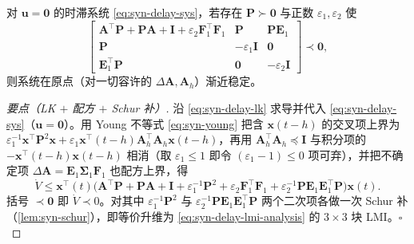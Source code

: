\begin{theorem}
\label{thm:syn-delay-stab}
对 $\mathbf u=\mathbf 0$ 的时滞系统 \cref{eq:syn-delay-sys}，若存在 $\mathbf P\succ\mathbf 0$ 与正数 $\varepsilon_1,\varepsilon_2$ 使
\begin{equation}
  \begin{bmatrix}\mathbf A^\top\mathbf P+\mathbf P\mathbf A+\mathbf I+\varepsilon_2\mathbf F_1^\top\mathbf F_1 & \mathbf P & \mathbf P\mathbf E_1\\ \mathbf P & -\varepsilon_1\mathbf I & \mathbf 0\\ \mathbf E_1^\top\mathbf P & \mathbf 0 & -\varepsilon_2\mathbf I\end{bmatrix}\prec\mathbf 0,
  \label{eq:syn-delay-lmi-analysis}
\end{equation}
则系统在原点（对一切容许的 $\Delta\mathbf A,\mathbf A_h$）渐近稳定。
\end{theorem}
\begin{proof}[要点（LK $+$ 配方 $+$ Schur 补）]
沿 \cref{eq:syn-delay-lk} 求导并代入 \cref{eq:syn-delay-sys}（$\mathbf u=\mathbf 0$）。用 Young 不等式 \cref{eq:syn-young} 把含 $\mathbf x(t-h)$ 的交叉项上界为 $\varepsilon_1^{-1}\mathbf x^\top\mathbf P^2\mathbf x+\varepsilon_1\mathbf x^\top(t-h)\mathbf A_h^\top\mathbf A_h\mathbf x(t-h)$，再用 $\mathbf A_h^\top\mathbf A_h\preceq\mathbf I$ 与积分项的 $-\mathbf x^\top(t-h)\mathbf x(t-h)$ 相消（取 $\varepsilon_1\le1$ 即令 $(\varepsilon_1-1)\le0$ 项可弃），并把不确定项 $\Delta\mathbf A=\mathbf E_1\boldsymbol\Sigma_1\mathbf F_1$ 也配方上界，得
\[
  \dot V\le\mathbf x^\top(t)\big(\mathbf A^\top\mathbf P+\mathbf P\mathbf A+\mathbf I+\varepsilon_1^{-1}\mathbf P^2+\varepsilon_2\mathbf F_1^\top\mathbf F_1+\varepsilon_2^{-1}\mathbf P\mathbf E_1\mathbf E_1^\top\mathbf P\big)\mathbf x(t).
\]
括号 $\prec\mathbf 0$ 即 $\dot V\prec0$。对其中 $\varepsilon_1^{-1}\mathbf P^2$ 与 $\varepsilon_2^{-1}\mathbf P\mathbf E_1\mathbf E_1^\top\mathbf P$ 两个二次项各做一次 Schur 补（\cref{lem:syn-schur}），即等价升维为 \cref{eq:syn-delay-lmi-analysis} 的 $3\times3$ 块 LMI。\hfill$\square$
\end{proof}

